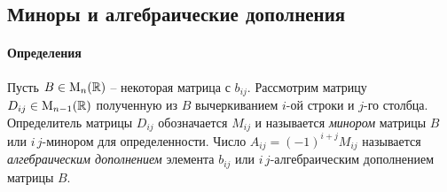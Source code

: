\subsection{Миноры и алгебраические дополнения}

\paragraph{Определения}

Пусть $B\in\operatorname{M}_{n}(\mathbb R)$ -- некоторая матрица с $b_{ij}$.
Рассмотрим матрицу $D_{ij}\in\operatorname{M}_{n-1}(\mathbb R)$ полученную из $B$ вычеркиванием $i$-ой строки и $j$-го столбца.
Определитель матрицы $D_{ij}$ обозначается $M_{ij}$ и называется {\it минором} матрицы $B$ или $i\,j$-минором для определенности.
Число $A_{ij} = (-1)^{i+j}M_{ij}$ называется {\it алгебраическим дополнением} элемента $b_{ij}$ или $i\,j$-алгебраическим дополнением матрицы $B$.

